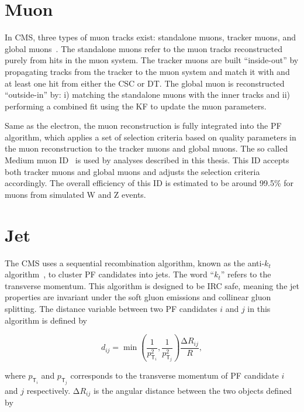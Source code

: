 \section{Muon}
\label{sec:Muon}

In \ac{CMS}, three types of muon tracks exist: standalone muons, tracker muons, and global muons~\cite{CMS:2018rym}. The standalone muons refer to the muon tracks reconstructed purely from hits in the muon system. The tracker muons are built ``inside-out'' by propagating tracks from the tracker to the muon system and match it with and at least one hit from either the \ac{CSC} or \ac{DT}. The global muon is reconstructed ``outside-in'' by: i) matching the standalone muons with the inner tracks and ii) performing a combined fit using the \ac{KF} to update the muon parameters. 

Same as the electron, the muon reconstruction is fully integrated into the \ac{PF} algorithm, which applies a set of selection criteria based on quality parameters in the muon reconstruction to the tracker muons and global muons. The so called Medium muon ID~\cite{CMS:2018rym} is used by analyses described in this thesis. This ID accepts both tracker muons and global muons and adjusts the selection criteria accordingly. The overall efficiency of this ID is estimated to be around 99.5\%  for muons from simulated W and Z events.

\section{Jet}
\label{sec:Jet}

The \ac{CMS} uses a sequential recombination algorithm, known as the anti-$k_t$ algorithm~\cite{Cacciari:2008gp}, to cluster \ac{PF} candidates into jets. The word ``$k_t$'' refers to the transverse momentum. This algorithm is designed to be \ac{IRC} safe, meaning the jet properties are invariant under the soft gluon emissions and collinear gluon splitting. The distance variable between two \ac{PF} candidates $i$ and $j$ in this algorithm is defined by 

\begin{equation}
\label{eq:ak}
d_{ij} = \min(\frac{1}{p_{\textsf{T}_i}^2},\frac{1}{p_{\textsf{T}_j}^2})\frac{\mathrm{\Delta}R_{ij}}{R},
\end{equation}

where $p_{\textsf{T}_i}$ and $p_{\textsf{T}_j}$ corresponds to the transverse momentum of \ac{PF} candidate $i$ and $j$ respectively. $\mathrm{\Delta}R_{ij}$ is the angular distance between the two objects defined by

